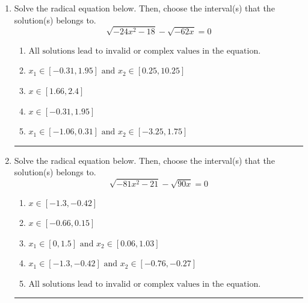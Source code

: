 \documentclass[14pt]{extbook}
\newcommand{\litem}[1]{\item#1\hspace*{-1cm}\rule{\textwidth}{0.4pt}}
\begin{document}
\begin{enumerate}
\litem{
Solve the radical equation below. Then, choose the interval(s) that the solution(s) belongs to.\[ \sqrt{-24 x^2 - 18} - \sqrt{-62 x} = 0 \]\begin{enumerate}[label=\Alph*.]
\item \( \text{All solutions lead to invalid or complex values in the equation.} \)
\item \( x_1 \in [-0.31, 1.95] \text{ and } x_2 \in [0.25,10.25] \)
\item \( x \in [1.66,2.4] \)
\item \( x \in [-0.31,1.95] \)
\item \( x_1 \in [-1.06, 0.31] \text{ and } x_2 \in [-3.25,1.75] \)

\end{enumerate} }
\litem{
Solve the radical equation below. Then, choose the interval(s) that the solution(s) belongs to.\[ \sqrt{-81 x^2 - 21} - \sqrt{90 x} = 0 \]\begin{enumerate}[label=\Alph*.]
\item \( x \in [-1.3,-0.42] \)
\item \( x \in [-0.66,0.15] \)
\item \( x_1 \in [0, 1.5] \text{ and } x_2 \in [0.06,1.03] \)
\item \( x_1 \in [-1.3, -0.42] \text{ and } x_2 \in [-0.76,-0.27] \)
\item \( \text{All solutions lead to invalid or complex values in the equation.} \)


\end{enumerate}}
\end{enumerate}
\end{document}
